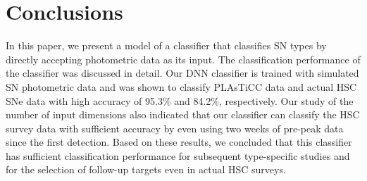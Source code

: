 \documentclass[proof]{pasj01}
\begin{document}
\section{Conclusions}
%
In this paper, we present a model of a classifier that classifies SN types by directly accepting photometric data as its input. The classification performance of the classifier was discussed in detail.
Our DNN classifier is trained with simulated SN photometric data and was shown to classify PLAsTiCC data and actual HSC SNe data with high accuracy of 95.3\% and 84.2\%, respectively.
Our study of the number of input dimensions also indicated that our classifier can classify the HSC survey data with sufficient accuracy by even using two weeks of pre-peak data since the first detection.
Based on these results, we concluded that this classifier has sufficient classification performance for subsequent type-specific studies and for the selection of follow-up targets even in actual HSC surveys.
%
\end{document}
